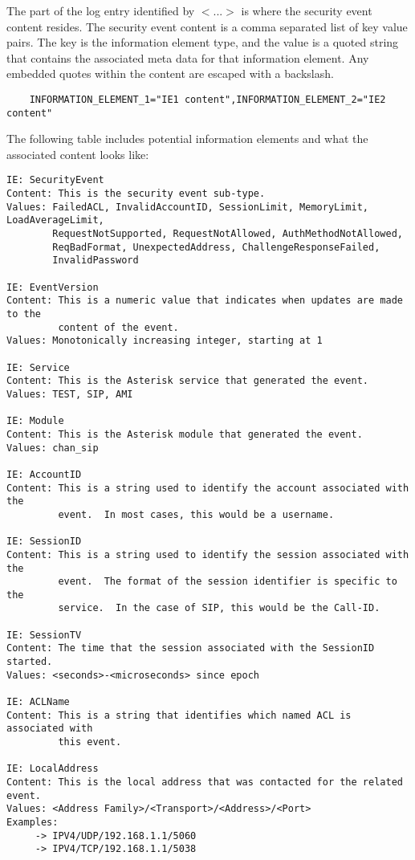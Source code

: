     The part of the log entry identified by $<$...$>$ is where the security event
content resides.  The security event content is a comma separated list
of key value pairs.  The key is the information element type, and the value is a
quoted string that contains the associated meta data for that information
element.  Any embedded quotes within the content are escaped with a
backslash.

\begin{verbatim}
    INFORMATION_ELEMENT_1="IE1 content",INFORMATION_ELEMENT_2="IE2 content"
\end{verbatim}

The following table includes potential information elements and what the
associated content looks like:

\begin{verbatim}
IE: SecurityEvent
Content: This is the security event sub-type.
Values: FailedACL, InvalidAccountID, SessionLimit, MemoryLimit, LoadAverageLimit,
        RequestNotSupported, RequestNotAllowed, AuthMethodNotAllowed,
        ReqBadFormat, UnexpectedAddress, ChallengeResponseFailed,
        InvalidPassword

IE: EventVersion
Content: This is a numeric value that indicates when updates are made to the
         content of the event.
Values: Monotonically increasing integer, starting at 1

IE: Service
Content: This is the Asterisk service that generated the event.
Values: TEST, SIP, AMI

IE: Module
Content: This is the Asterisk module that generated the event.
Values: chan_sip

IE: AccountID
Content: This is a string used to identify the account associated with the
         event.  In most cases, this would be a username.

IE: SessionID
Content: This is a string used to identify the session associated with the
         event.  The format of the session identifier is specific to the
         service.  In the case of SIP, this would be the Call-ID.

IE: SessionTV
Content: The time that the session associated with the SessionID started.
Values: <seconds>-<microseconds> since epoch

IE: ACLName
Content: This is a string that identifies which named ACL is associated with
         this event.

IE: LocalAddress
Content: This is the local address that was contacted for the related event.
Values: <Address Family>/<Transport>/<Address>/<Port>
Examples:
     -> IPV4/UDP/192.168.1.1/5060
     -> IPV4/TCP/192.168.1.1/5038


\end{verbatim}
